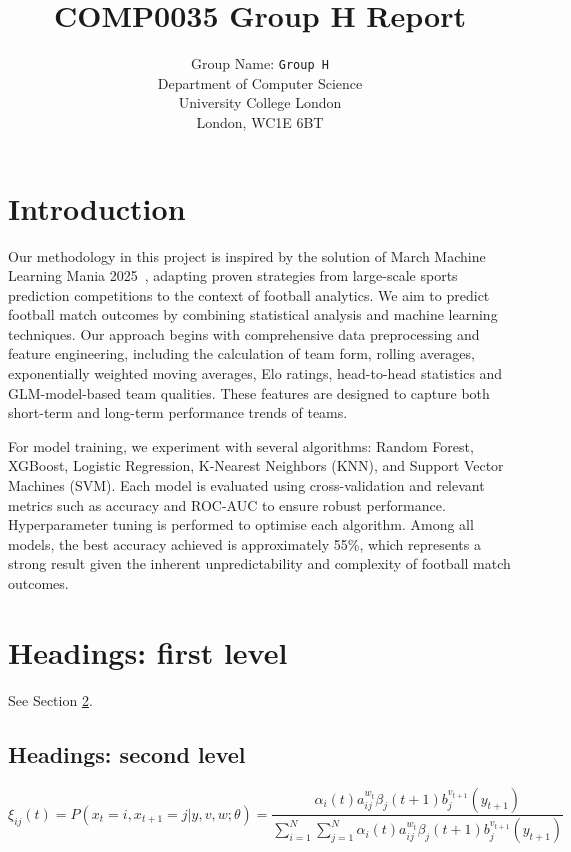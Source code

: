 \documentclass{article}
\title{COMP0035 Group H Report}
\author{
 Group Name: \texttt{Group H}\\
  Department of Computer Science\\
  University College London\\
  London, WC1E 6BT\\
}
\begin{document}
\maketitle





\section{Introduction}
Our methodology in this project is inspired by the solution of March Machine Learning Mania 2025~\cite{odeh2025}, adapting proven strategies from large-scale sports prediction competitions to the context of football analytics. We aim to predict football match outcomes by combining statistical analysis and machine learning techniques. Our approach begins with comprehensive data preprocessing and feature engineering, including the calculation of team form, rolling averages, exponentially weighted moving averages, Elo ratings, head-to-head statistics and GLM-model-based team qualities. These features are designed to capture both short-term and long-term performance trends of teams.

For model training, we experiment with several algorithms: Random Forest, XGBoost, Logistic Regression, K-Nearest Neighbors (KNN), and Support Vector Machines (SVM). Each model is evaluated using cross-validation and relevant metrics such as accuracy and ROC-AUC to ensure robust performance. Hyperparameter tuning is performed to optimise each algorithm. Among all models, the best accuracy achieved is approximately 55\%, which represents a strong result given the inherent unpredictability and complexity of football match outcomes.

\section{Headings: first level}
\label{sec:headings}

\lipsum[4] See Section \ref{sec:headings}.

\subsection{Headings: second level}
\lipsum[5]
\begin{equation}
\xi _{ij}(t)=P(x_{t}=i,x_{t+1}=j|y,v,w;\theta)= {\frac {\alpha _{i}(t)a^{w_t}_{ij}\beta _{j}(t+1)b^{v_{t+1}}_{j}(y_{t+1})}{\sum _{i=1}^{N} \sum _{j=1}^{N} \alpha _{i}(t)a^{w_t}_{ij}\beta _{j}(t+1)b^{v_{t+1}}_{j}(y_{t+1})}}
\end{equation}
\end{document}

